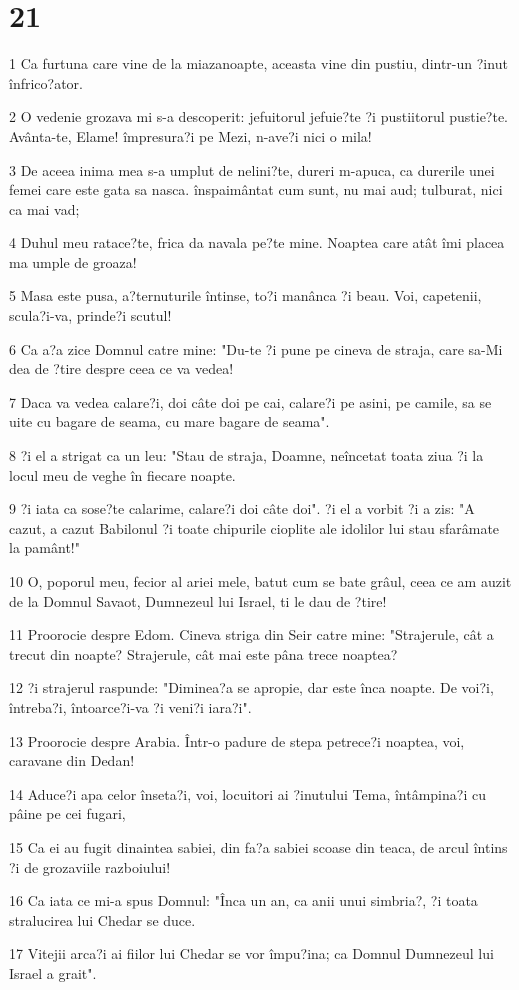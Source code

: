\chapter{21}

\par 1 Ca furtuna care vine de la miazanoapte, aceasta vine din pustiu, dintr-un ?inut înfrico?ator.
\par 2 O vedenie grozava mi s-a descoperit: jefuitorul jefuie?te ?i pustiitorul pustie?te. Avânta-te, Elame! împresura?i pe Mezi, n-ave?i nici o mila!
\par 3 De aceea inima mea s-a umplut de nelini?te, dureri m-apuca, ca durerile unei femei care este gata sa nasca. înspaimântat cum sunt, nu mai aud; tulburat, nici ca mai vad;
\par 4 Duhul meu ratace?te, frica da navala pe?te mine. Noaptea care atât îmi placea ma umple de groaza!
\par 5 Masa este pusa, a?ternuturile întinse, to?i manânca ?i beau. Voi, capetenii, scula?i-va, prinde?i scutul!
\par 6 Ca a?a zice Domnul catre mine: "Du-te ?i pune pe cineva de straja, care sa-Mi dea de ?tire despre ceea ce va vedea!
\par 7 Daca va vedea calare?i, doi câte doi pe cai, calare?i pe asini, pe camile, sa se uite cu bagare de seama, cu mare bagare de seama".
\par 8 ?i el a strigat ca un leu: "Stau de straja, Doamne, neîncetat toata ziua ?i la locul meu de veghe în fiecare noapte.
\par 9 ?i iata ca sose?te calarime, calare?i doi câte doi". ?i el a vorbit ?i a zis: "A cazut, a cazut Babilonul ?i toate chipurile cioplite ale idolilor lui stau sfarâmate la pamânt!"
\par 10 O, poporul meu, fecior al ariei mele, batut cum se bate grâul, ceea ce am auzit de la Domnul Savaot, Dumnezeul lui Israel, ti le dau de ?tire!
\par 11 Proorocie despre Edom. Cineva striga din Seir catre mine: "Strajerule, cât a trecut din noapte? Strajerule, cât mai este pâna trece noaptea?
\par 12 ?i strajerul raspunde: "Diminea?a se apropie, dar este înca noapte. De voi?i, întreba?i, întoarce?i-va ?i veni?i iara?i".
\par 13 Proorocie despre Arabia. Într-o padure de stepa petrece?i noaptea, voi, caravane din Dedan!
\par 14 Aduce?i apa celor înseta?i, voi, locuitori ai ?inutului Tema, întâmpina?i cu pâine pe cei fugari,
\par 15 Ca ei au fugit dinaintea sabiei, din fa?a sabiei scoase din teaca, de arcul întins ?i de grozaviile razboiului!
\par 16 Ca iata ce mi-a spus Domnul: "Înca un an, ca anii unui simbria?, ?i toata stralucirea lui Chedar se duce.
\par 17 Vitejii arca?i ai fiilor lui Chedar se vor împu?ina; ca Domnul Dumnezeul lui Israel a grait".

